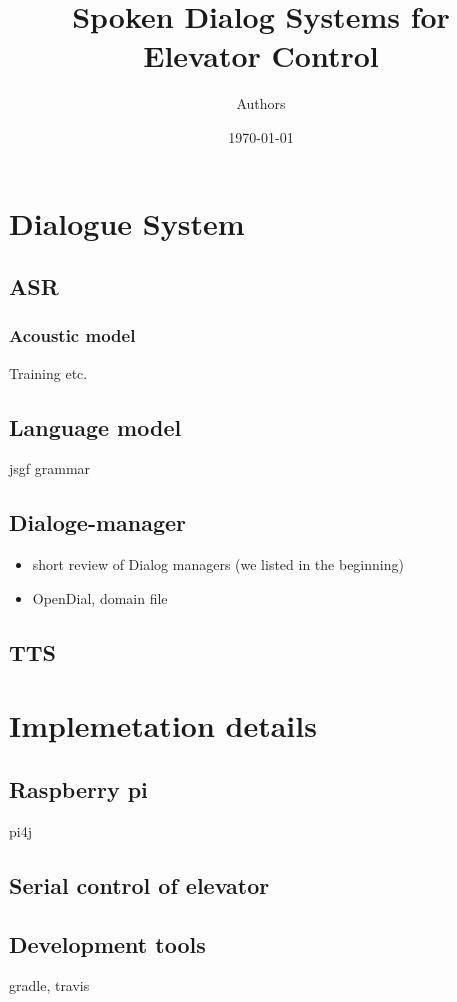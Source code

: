\documentclass[11pt]{article}
\title{Spoken Dialog Systems for Elevator Control}
\author{Authors}
\date{\today}
\begin{document}
\maketitle


\section*{Dialogue System}
\subsection*{ASR}
\subsubsection*{Acoustic model}
Training etc.
\subsection*{Language model}
jsgf grammar
\subsection*{Dialoge-manager}
\begin{itemize}
\item
short review of Dialog managers (we listed in the beginning)
\item 
OpenDial, domain file
\end{itemize}
\subsection*{TTS}

\section*{Implemetation details}
\subsection*{Raspberry pi}
pi4j
\subsection*{Serial control of elevator}
\subsection*{Development tools}
gradle, travis

\end{document}
